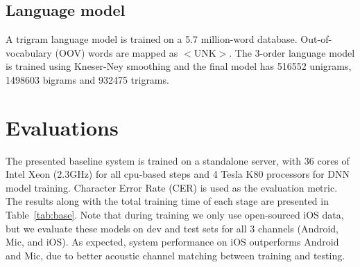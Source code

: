\documentclass[a4paper]{article}
\begin{document}

\subsection{Language model}

A trigram language model is trained on a 5.7 million-word database. Out-of-vocabulary (OOV) words are mapped as $<$UNK$>$. The 3-order language model is trained using Kneser-Ney smoothing and the final model has 516552 unigrams, 1498603 bigrams and 932475 trigrams.

\section{Evaluations}

The presented baseline system is trained on a standalone server, with 36 cores of Intel Xeon (2.3GHz) for all cpu-based steps and 4
Tesla K80 processors for DNN model training. Character Error Rate (CER) is used as the evaluation metric. 
The results along with the total training time of each stage are presented in Table~\ref{tab:base}. 
Note that during training we only use open-sourced iOS data, but we evaluate
these models on dev and test sets for all 3 channels (Android, Mic, and iOS). As
expected, system performance on iOS outperforms Android and Mic, due to better
acoustic channel matching between training and testing.
\end{document}
